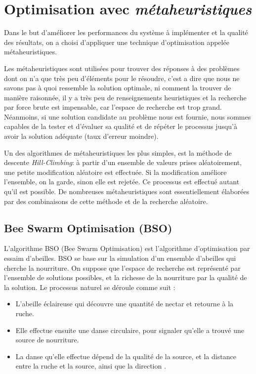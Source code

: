 \section{Optimisation avec \textit{métaheuristiques}}

Dans le but d’améliorer les performances du système  à implémenter et la qualité des résultats, on a choisi d'appliquer une technique d’optimisation appelée métaheuristiques.     

Les métaheuristiques sont utilisées pour trouver des réponses à des problèmes dont on n'a que très peu d'éléments pour le résoudre, c'est a dire que nous ne savons pas à quoi ressemble la solution optimale, ni comment la trouver de manière raisonnée, il y a très peu de renseignements heuristiques et la recherche par force brute est impensable, car l'espace de recherche est trop grand. 
Néanmoins, si une solution candidate au problème nous est fournie, nous sommes capables de la tester et d'évaluer sa qualité et de répéter le processus jusqu'à avoir la solution adéquate (taux d'erreur moindre).

Un des algorithmes de métaheuristiques les plus simples, est la méthode de descente \textit{Hill-Climbing}: à partir d’un ensemble de valeurs prises aléatoirement, une petite modification aléatoire est effectuée. Si la modification améliore l’ensemble, on la garde, sinon elle est rejetée. Ce processus est effectué autant qu’il est possible. De nombreuses métaheuristiques sont essentiellement élaborées par des combinaisons de cette méthode et de la recherche aléatoire.

\subsection{Bee Swarm Optimisation (BSO)}

L'algorithme BSO (Bee Swarm Optimisation) est l'algorithme d'optimisation par essaim d'abeilles. BSO se base sur la simulation d’un ensemble d'abeilles qui cherche la nourriture. On suppose que l’espace de recherche est représenté par l’ensemble de solutions possibles, et la richesse de la nourriture par la qualité de la solution. Le processus naturel se déroule comme suit :
\begin{itemize}
\item L'abeille éclaireuse qui découvre une quantité de nectar et retourne à la ruche.
\item Elle effectue ensuite une danse circulaire, pour signaler qu’elle a trouvé une source de nourriture.
\item La danse qu’elle effectue dépend de la qualité de la source, et la distance entre la ruche et la source, ainsi que la direction \cite{ref34}.
\end{itemize}

